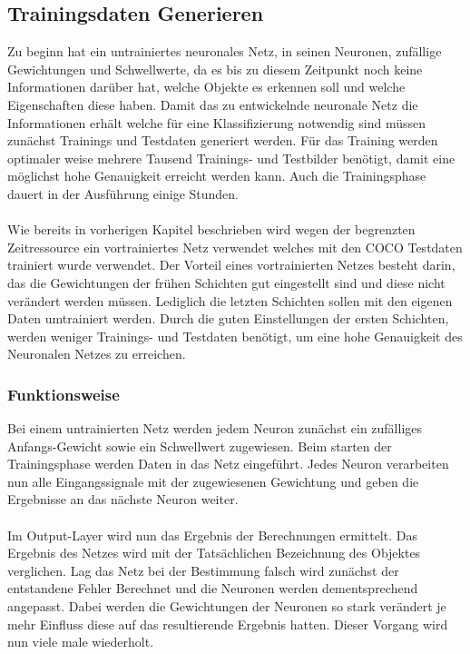 \documentclass[a4paper,12pt,oneside]{article}
\begin{document}
  \subsection{Trainingsdaten Generieren} 
Zu beginn hat ein untrainiertes neuronales Netz, in seinen Neuronen, zufällige Gewichtungen und Schwellwerte, da es bis zu diesem Zeitpunkt noch keine Informationen darüber hat, welche Objekte es erkennen soll und welche Eigenschaften diese haben. Damit das zu entwickelnde neuronale Netz die Informationen erhält welche für eine Klassifizierung notwendig sind müssen zunächst Trainings und Testdaten generiert werden. Für das Training werden optimaler weise mehrere Tausend Trainings- und Testbilder benötigt, damit eine möglichst hohe Genauigkeit erreicht werden kann. Auch die Trainingsphase dauert in der Ausführung einige Stunden. 
\\
\\
Wie bereits in vorherigen Kapitel beschrieben wird wegen der begrenzten Zeitressource ein vortrainiertes Netz verwendet welches mit den COCO Testdaten trainiert wurde verwendet. Der Vorteil eines vortrainierten Netzes besteht darin, das die Gewichtungen der frühen Schichten gut eingestellt sind und diese nicht verändert werden müssen. Lediglich die letzten Schichten sollen mit den eigenen Daten umtrainiert werden. Durch die guten Einstellungen der ersten Schichten, werden weniger Trainings- und Testdaten benötigt, um eine hohe Genauigkeit des Neuronalen Netzes zu erreichen.

  \subsubsection{Funktionsweise}
Bei einem untrainierten Netz werden jedem Neuron zunächst ein zufälliges Anfangs-Gewicht sowie ein Schwellwert zugewiesen. Beim starten der Trainingsphase werden Daten in das Netz eingeführt. Jedes Neuron verarbeiten nun alle Eingangssignale mit der zugewiesenen Gewichtung und geben die Ergebnisse an das nächste Neuron weiter. 
\\
\\
Im Output-Layer wird nun das Ergebnis der Berechnungen ermittelt. Das Ergebnis des Netzes wird mit der Tatsächlichen Bezeichnung des Objektes verglichen. Lag das Netz bei der Bestimmung falsch wird zunächst der entstandene Fehler Berechnet und die Neuronen werden dementsprechend angepasst. Dabei werden die Gewichtungen der Neuronen so stark verändert je mehr Einfluss diese auf das resultierende Ergebnis hatten. Dieser Vorgang wird nun viele male wiederholt. \\
  
\end{document}
